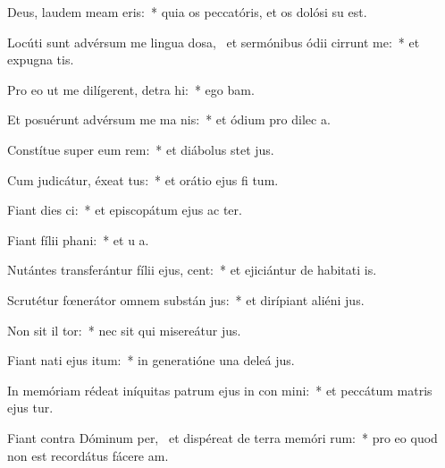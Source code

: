 \item Deus, laudem meam  eris:~* quia os peccatóris, et os dolósi su   est.
\item Locúti sunt advérsum me lingua dosa,~\pscross{} et sermónibus ódii cirrunt me:~* et expugna  tis.
\item Pro eo ut me dilígerent, detra hi:~* ego  bam.
\item Et posuérunt advérsum me ma  nis:~* et ódium pro dilec a.
\item Constítue super eum rem:~* et diábolus stet   jus.
\item Cum judicátur, éxeat tus:~* et orátio ejus fi  tum.
\item Fiant dies  ci:~* et episcopátum ejus ac ter.
\item Fiant fílii  phani:~* et u  a.
\item Nutántes transferántur fílii ejus,  cent:~* et ejiciántur de habitati is.
\item Scrutétur fœnerátor omnem substán jus:~* et dirípiant aliéni  jus.
\item Non sit il tor:~* nec sit qui misereátur  jus.
\item Fiant nati ejus  itum:~* in generatióne una deleá  jus.
\item In memóriam rédeat iníquitas patrum ejus in con mini:~* et peccátum matris ejus  tur.
\item Fiant contra Dóminum per,~\pscross{} et dispéreat de terra memóri rum:~* pro eo quod non est recordátus fácere am.
